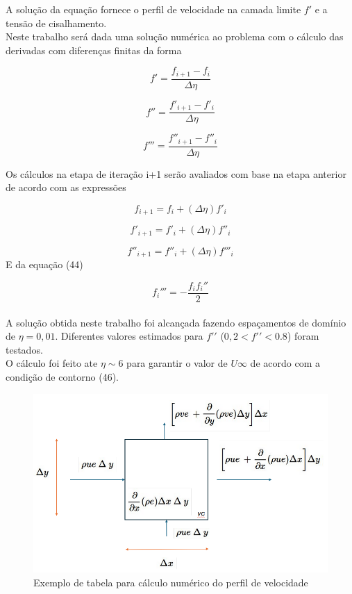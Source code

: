 \documentclass[12pt]{article}
\begin{document}
A solução da equação fornece o perfil de velocidade na camada limite $f\prime$ e a tensão de cisalhamento. \\
Neste trabalho será dada uma solução numérica ao problema com o cálculo das derivadas com diferenças finitas da forma

\begin{equation}
	f' = \frac{f_{i+1} - f_i}{\Delta \eta}
\end{equation}

\begin{equation}
	f'' = \frac{f'_{i+1} - f'_i}{\Delta \eta}
\end{equation}

\begin{equation}
	f''' = \frac{f''_{i+1} - f''_i}{\Delta \eta}
\end{equation}

Os cálculos na etapa de iteração i+1 serão avaliados com base na etapa anterior de acordo com as expressões

\begin{equation}
	f_{i+1} = f_i + (\Delta \eta) f'_i
\end{equation}

\begin{equation}
	f'_{i+1} = f'_i + (\Delta \eta) f''_i
\end{equation}

\begin{equation}
	f''_{i+1} = f''_i + (\Delta \eta) f'''_i
\end{equation}
E da equação (44)

\begin{equation}
	f_i''' = -\frac{f_i f_i''}{2}
\end{equation}
\\

A solução obtida neste trabalho foi alcançada fazendo espaçamentos de domínio de $\eta = 0,01$. Diferentes valores estimados para $f\prime\prime$ ($0,2 < f\prime\prime < 0.8$) foram testados. \\
 
 O cálculo foi feito ate $\eta \sim 6$ para garantir o valor de $U\infty$ de acordo com a condição de contorno (46).
 
 \begin{figure}[H]
 	\centering
 	\includegraphics[width=.65\textwidth]{Figures/1_4}
 	\caption{Exemplo de tabela para cálculo numérico do perfil de velocidade}
 \end{figure}
 
\end{document}
